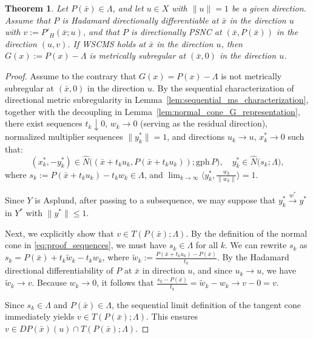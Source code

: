 \documentclass[12pt,twoside,reqno]{amsart}
\newtheorem{theorem}{Theorem}[section]
\theoremstyle{definition}
\numberwithin{equation}{section}
\begin{document}
\begin{theorem} \label{thm:sufficient_condition_for_mscq}
    Let $P(\bar{x})\in\Lambda$, and let $u \in X$ with $\|u\| = 1$ be a given direction. Assume that $P$ is Hadamard directionally differentiable at $\bar{x}$ in the direction $u$ with $v := P'_H(\bar{x}; u)$, and that $P$ is directionally PSNC at $(\bar{x}, P(\bar{x}))$ in the direction $(u, v)$. If WSCMS holds at $\bar{x}$ in the direction $u$, then $G(x) := P(x) - \Lambda$ is metrically subregular at $(\bar{x}, 0)$ in the direction $u$.
\end{theorem}

\begin{proof}
    Assume to the contrary that $G(x) = P(x) - \Lambda$ is not metrically subregular at $(\bar{x}, 0)$ in the direction $u$. By the sequential characterization of directional metric subregularity in Lemma~\ref{lem:sequential_ms_characterization}, together with the decoupling in Lemma~\ref{lem:normal_cone_G_representation}, there exist sequences $t_k \downarrow 0$, $w_k \to 0$ (serving as the residual direction), normalized multiplier sequences $\|y_k^*\| = 1$, and directions $u_k \to u$, $x_k^* \to 0$ such that:
    \begin{equation} \label{eq:proof_sequences}
        (x_k^*, -y_k^*) \in \widehat{N}\bigl((\bar{x} + t_k u_k, P(\bar{x} + t_k u_k)); \mathrm{gph}\, P\bigr), \quad y_k^* \in \widehat{N}\bigl(s_k; \Lambda\bigr),
    \end{equation}
    where $s_k := P(\bar{x} + t_k u_k) - t_k w_k \in \Lambda$, and $\lim_{k \to \infty} \langle y_k^*, \frac{w_k}{\|w_k\|} \rangle = 1$. 

    Since $Y$ is Asplund, after passing to a subsequence, we may suppose that $y_k^* \xrightarrow{w^*} y^*$ in $Y^*$ with $\|y^*\| \leq 1$.
    
    Next, we explicitly show that $v \in T(P(\bar{x}); \Lambda)$. By the definition of the normal cone in \eqref{eq:proof_sequences}, we must have $s_k \in \Lambda$ for all $k$. We can rewrite $s_k$ as $s_k = P(\bar{x}) + t_k \tilde{w}_k - t_k w_k$, where $\tilde{w}_k := \frac{P(\bar{x} + t_k u_k) - P(\bar{x})}{t_k}$. By the Hadamard directional differentiability of $P$ at $\bar{x}$ in direction $u$, and since $u_k \to u$, we have $\tilde{w}_k \to v$. Because $w_k \to 0$, it follows that $\frac{s_k - P(\bar{x})}{t_k} = \tilde{w}_k - w_k \to v - 0 = v$.
    
    Since $s_k \in \Lambda$ and $P(\bar{x}) \in \Lambda$, the sequential limit definition of the tangent cone immediately yields $v \in T(P(\bar{x}); \Lambda)$. This ensures $v \in DP(\bar{x})(u) \cap T(P(\bar{x}); \Lambda)$. 


\end{proof}
\end{document}
